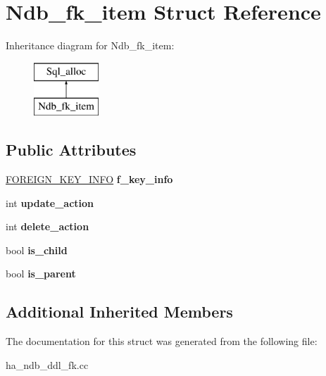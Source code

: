 \hypertarget{structNdb__fk__item}{}\section{Ndb\+\_\+fk\+\_\+item Struct Reference}
\label{structNdb__fk__item}
Inheritance diagram for Ndb\+\_\+fk\+\_\+item\+:\begin{figure}[H]
\begin{center}
\leavevmode
\includegraphics[height=2.000000cm]{structNdb__fk__item}
\end{center}
\end{figure}
\subsection*{Public Attributes}
\begin{DoxyCompactItemize}
\item 
\mbox{\label{structNdb__fk__item_a2dd8e27cf63546fcbd014b024e8c454e}} 
\mbox{\hyperlink{structst__foreign__key__info}{F\+O\+R\+E\+I\+G\+N\+\_\+\+K\+E\+Y\+\_\+\+I\+N\+FO}} {\bfseries f\+\_\+key\+\_\+info}
\item 
\mbox{\label{structNdb__fk__item_a1ba01ceacd7b8aeb8462491c15a0d2c7}} 
int {\bfseries update\+\_\+action}
\item 
\mbox{\label{structNdb__fk__item_aa6b81a3a24b27905f11b77894121a263}} 
int {\bfseries delete\+\_\+action}
\item 
\mbox{\label{structNdb__fk__item_a6d8e28953e64b72ce7409bd9fa4144cb}} 
bool {\bfseries is\+\_\+child}
\item 
\mbox{\label{structNdb__fk__item_a16b25b5aac8c9551d5def85b131aef22}} 
bool {\bfseries is\+\_\+parent}
\end{DoxyCompactItemize}
\subsection*{Additional Inherited Members}


The documentation for this struct was generated from the following file\+:\begin{DoxyCompactItemize}
\item 
ha\+\_\+ndb\+\_\+ddl\+\_\+fk.\+cc\end{DoxyCompactItemize}
